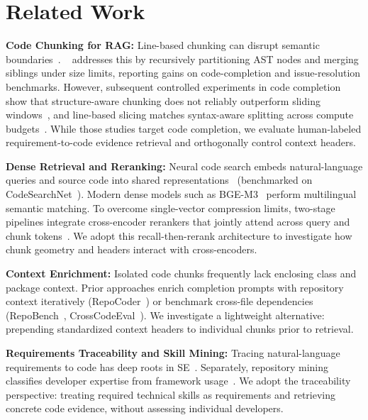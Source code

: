 \section{Related Work}
\label{sec:related_work}

\textbf{Code Chunking for RAG:} Line-based chunking can disrupt semantic boundaries~\cite{zhang2025cast}. \castname~\cite{zhang2025cast} addresses this by recursively partitioning AST nodes and merging siblings under size limits, reporting gains on code-completion and issue-resolution benchmarks. However, subsequent controlled experiments in code completion show that structure-aware chunking does not reliably outperform sliding windows~\cite{wu2026chunking}, and line-based slicing matches syntax-aware splitting across compute budgets~\cite{galimzyanov2025practical}. While those studies target code completion, we evaluate human-labeled requirement-to-code evidence retrieval and orthogonally control context headers.

\textbf{Dense Retrieval and Reranking:} Neural code search embeds natural-language queries and source code into shared representations~\cite{feng2020codebert,guo2022unixcoder} (benchmarked on CodeSearchNet~\cite{husain2019codesearchnet}). Modern dense models such as BGE-M3~\cite{chen2024bgem3} perform multilingual semantic matching. To overcome single-vector compression limits, two-stage pipelines integrate cross-encoder rerankers that jointly attend across query and chunk tokens~\cite{hu2023revisiting,costv2024apsec}. We adopt this recall-then-rerank architecture to investigate how chunk geometry and headers interact with cross-encoders.

\textbf{Context Enrichment:} Isolated code chunks frequently lack enclosing class and package context. Prior approaches enrich completion prompts with repository context iteratively (RepoCoder~\cite{zhang2023repocoder}) or benchmark cross-file dependencies (RepoBench~\cite{liu2024repobench}, CrossCodeEval~\cite{ding2023crosscodeeval}). We investigate a lightweight alternative: prepending standardized context headers to individual chunks prior to retrieval.

\textbf{Requirements Traceability and Skill Mining:} Tracing natural-language requirements to code has deep roots in SE~\cite{antoniol2002traceability,gao2024triad}. Separately, repository mining classifies developer expertise from framework usage~\cite{montandon2019identifying}. We adopt the traceability perspective: treating required technical skills as requirements and retrieving concrete code evidence, without assessing individual developers.
